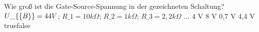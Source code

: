     {Wie groß ist die Gate-Source-Spannung in der gezeichneten Schaltung? $U\_\{\textrm\{B\}\} = 44 V$; $R\_1 = 10 k\Omega$; $R\_2 = 1 k\Omega$; $R\_3 = 2,2 k\Omega$ ...}
    {4 V}
    {8 V}
    {0,7 V }
    {4,4 V}
    {true}{false}